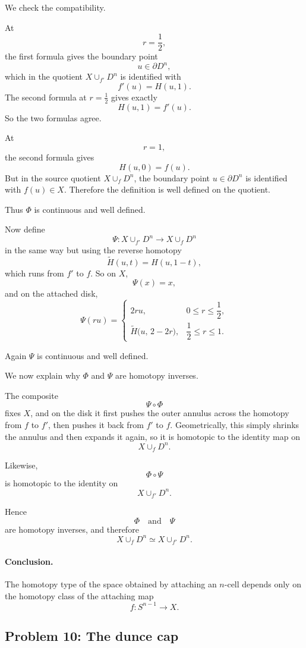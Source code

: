 \documentclass[12pt,a4paper]{article}
\theoremstyle{notespace}
\begin{document}
We check the compatibility.

At
\[
r=\frac12,
\]
the first formula gives the boundary point
\[
u\in \partial D^n,
\]
which in the quotient \(X\cup_{f'} D^n\) is identified with
\[
f'(u)=H(u,1).
\]
The second formula at \(r=\frac12\) gives exactly
\[
H(u,1)=f'(u).
\]
So the two formulas agree.

At
\[
r=1,
\]
the second formula gives
\[
H(u,0)=f(u).
\]
But in the source quotient \(X\cup_f D^n\), the boundary point \(u\in \partial D^n\) is identified with \(f(u)\in X\). Therefore the definition is well defined on the quotient.

Thus \(\Phi\) is continuous and well defined.

\medskip

Now define
\[
\Psi:X\cup_{f'} D^n \to X\cup_f D^n
\]
in the same way but using the reverse homotopy
\[
\widetilde{H}(u,t)=H(u,1-t),
\]
which runs from \(f'\) to \(f\). So on \(X\),
\[
\Psi(x)=x,
\]
and on the attached disk,
\[
\Psi(ru)=
\begin{cases}
	2ru, & 0\le r\le \dfrac12,\\[1.2ex]
	\widetilde{H}\bigl(u,\,2-2r\bigr), & \dfrac12\le r\le 1.
\end{cases}
\]

Again \(\Psi\) is continuous and well defined.

\medskip

We now explain why \(\Phi\) and \(\Psi\) are homotopy inverses.

The composite
\[
\Psi\circ \Phi
\]
fixes \(X\), and on the disk it first pushes the outer annulus across the homotopy from \(f\) to \(f'\), then pushes it back from \(f'\) to \(f\). Geometrically, this simply shrinks the annulus and then expands it again, so it is homotopic to the identity map on
\[
X\cup_f D^n.
\]

Likewise,
\[
\Phi\circ \Psi
\]
is homotopic to the identity on
\[
X\cup_{f'} D^n.
\]

Hence
\[
\Phi
\quad\text{and}\quad
\Psi
\]
are homotopy inverses, and therefore
\[
X\cup_f D^n \simeq X\cup_{f'} D^n.
\]

\paragraph{Conclusion.}
The homotopy type of the space obtained by attaching an \(n\)-cell depends only on the homotopy class of the attaching map
\[
f:S^{n-1}\to X.
\]

\subsection{Problem 10: The dunce cap}
\end{document}

